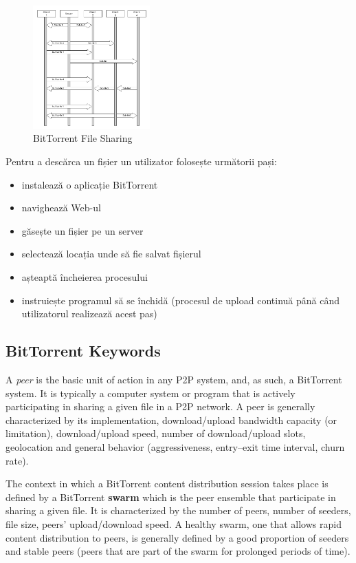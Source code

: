 \begin{figure}
  \centering
  \includegraphics[width=0.4\textwidth]{src/img/p2p-systems/bittorrent-sharing}
  \caption{BitTorrent File Sharing}
  \label{fig:p2p-systems:bittorrent-sharing}
\end{figure}

Pentru a descărca un fișier un utilizator folosește următorii pași:

\begin{itemize}
  \item instalează o aplicație BitTorrent
  \item navighează Web-ul
  \item găsește un fișier pe un server
  \item selectează locația unde să fie salvat fișierul
  \item așteaptă încheierea procesului
  \item instruiește programul să se închidă (procesul de upload continuă până
  când utilizatorul realizează acest pas)
\end{itemize}

\subsection{BitTorrent Keywords}

A \textit{peer} is the basic unit of action in any P2P system, and, as such, a
BitTorrent system. It is typically a computer system or program that is
actively participating in sharing a given file in a P2P network. A peer is
generally characterized by its implementation, download/upload bandwidth
capacity (or limitation), download/upload speed, number of download/upload
slots, geolocation and general behavior (aggressiveness, entry--exit time
interval, churn rate).

The context in which a BitTorrent content distribution session takes place is
defined by a BitTorrent \textbf{swarm} which is the peer ensemble that
participate in sharing a given file. It is characterized by the number of
peers, number of seeders, file size, peers' upload/download speed. A healthy
swarm, one that allows rapid content distribution to peers, is generally
defined by a good proportion of seeders and stable peers (peers that are part
of the swarm for prolonged periods of time).

